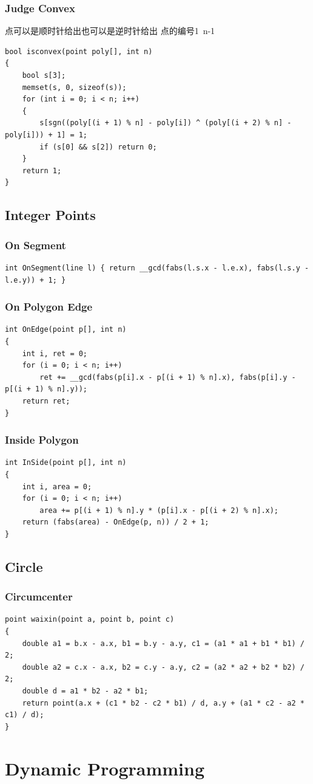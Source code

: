 \documentclass[twoside]{article}
\begin{document}
\subsubsection{Judge Convex}
点可以是顺时针给出也可以是逆时针给出
点的编号1~n-1
\begin{lstlisting}
bool isconvex(point poly[], int n)
{
    bool s[3];
    memset(s, 0, sizeof(s));
    for (int i = 0; i < n; i++)
    {
        s[sgn((poly[(i + 1) % n] - poly[i]) ^ (poly[(i + 2) % n] - poly[i])) + 1] = 1;
        if (s[0] && s[2]) return 0;
    }
    return 1;
}
\end{lstlisting}
\subsection{Integer Points}
\subsubsection{On Segment}
\begin{lstlisting}
int OnSegment(line l) { return __gcd(fabs(l.s.x - l.e.x), fabs(l.s.y - l.e.y)) + 1; }
\end{lstlisting}
\subsubsection{On Polygon Edge}
\begin{lstlisting}
int OnEdge(point p[], int n)
{
    int i, ret = 0;
    for (i = 0; i < n; i++)
        ret += __gcd(fabs(p[i].x - p[(i + 1) % n].x), fabs(p[i].y - p[(i + 1) % n].y));
    return ret;
}
\end{lstlisting}
\subsubsection{Inside Polygon}
\begin{lstlisting}
int InSide(point p[], int n)
{
    int i, area = 0;
    for (i = 0; i < n; i++)
        area += p[(i + 1) % n].y * (p[i].x - p[(i + 2) % n].x);
    return (fabs(area) - OnEdge(p, n)) / 2 + 1;
}
\end{lstlisting}
\subsection{Circle}
\subsubsection{Circumcenter}
\begin{lstlisting}
point waixin(point a, point b, point c)
{
    double a1 = b.x - a.x, b1 = b.y - a.y, c1 = (a1 * a1 + b1 * b1) / 2;
    double a2 = c.x - a.x, b2 = c.y - a.y, c2 = (a2 * a2 + b2 * b2) / 2;
    double d = a1 * b2 - a2 * b1;
    return point(a.x + (c1 * b2 - c2 * b1) / d, a.y + (a1 * c2 - a2 * c1) / d);
}
\end{lstlisting}
\clearpage\section{Dynamic Programming}
\end{document}
